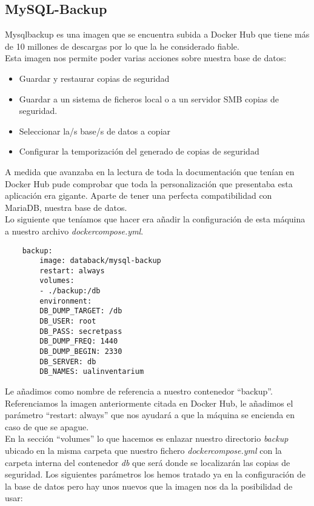 \subsection{MySQL-Backup}
Mysql\-backup es una imagen que se encuentra subida a Docker Hub que tiene más de 10 millones de descargas por lo que la he considerado fiable.
\\Esta imagen nos permite poder varias acciones sobre nuestra base de datos:
\begin{itemize}
    \item Guardar y restaurar copias de seguridad
    \item Guardar a un sistema de ficheros local o a un servidor SMB copias de seguridad.
    \item Seleccionar la/s base/s de datos a copiar
    \item Configurar la temporización del generado de copias de seguridad
\end{itemize}
A medida que avanzaba en la lectura de toda la documentación que tenían en Docker Hub pude comprobar que toda la personalización que presentaba esta aplicación era gigante. Aparte de tener una perfecta compatibilidad con MariaDB, nuestra base de datos.
\\Lo siguiente que teníamos que hacer era añadir la configuración de esta máquina a nuestro archivo \textit{docker\-compose.yml}.
\begin{verbatim}
    backup:
        image: databack/mysql-backup
        restart: always
        volumes:
        - ./backup:/db
        environment:
        DB_DUMP_TARGET: /db
        DB_USER: root
        DB_PASS: secretpass
        DB_DUMP_FREQ: 1440
        DB_DUMP_BEGIN: 2330
        DB_SERVER: db
        DB_NAMES: ualinventarium
\end{verbatim}
Le añadimos como nombre de referencia a nuestro contenedor ``backup''. Referenciamos la imagen anteriormente citada en Docker Hub, le añadimos el parámetro ``restart: always'' que nos ayudará a que la máquina se encienda en caso de que se apague.
\\En la sección ``volumes'' lo que hacemos es enlazar nuestro directorio \textit{backup} ubicado en la misma carpeta que nuestro fichero \textit{docker\-compose.yml} con la carpeta interna del contenedor \textit{db} que será donde se localizarán las copias de seguridad. Los siguientes parámetros los hemos tratado ya en la configuración de la base de datos pero hay unos nuevos que la imagen nos da la posibilidad de usar:
